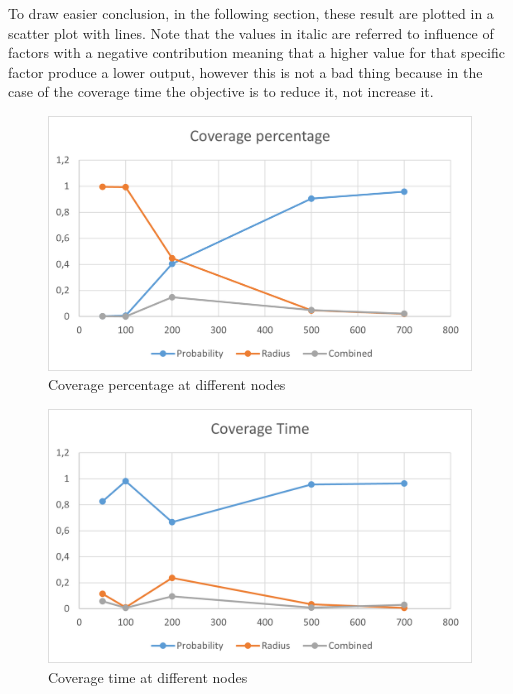 To draw easier conclusion, in the following section, these result are plotted in a scatter plot with lines. Note that the values in italic are referred to influence of factors with a negative contribution meaning that a higher value for that specific factor produce a lower output, however this is not a bad thing because in the case of the coverage time the objective is to reduce it, not increase it.

\begin{figure}[H]
\centering
    \includegraphics[width= 1\textwidth]{./images/CoveragePercentageWithNodes.png}
    \caption{Coverage percentage at different nodes}
    \label{fig:CovPercInfluence}
\end{figure}


\begin{figure}[H]\label{fig:CovTimeInfluence}
\centering
    \includegraphics[width= 1\textwidth]{./images/CoverageTimeWithNodes.png}
    \caption{Coverage time at different nodes}
\end{figure}

